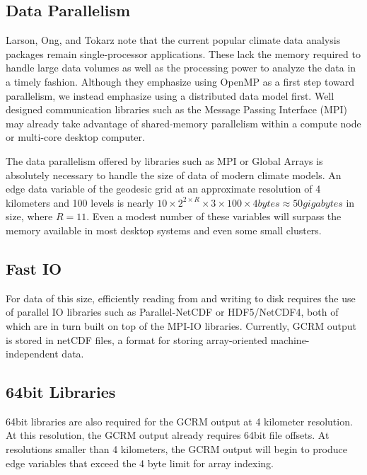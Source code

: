 \subsection{Data Parallelism}

Larson, Ong, and Tokarz note that the current popular climate data analysis
packages remain single-processor applications. These lack the memory required
to handle large data volumes as well as the processing power to analyze the
data in a timely fashion\cite{MODSIM07:LOT}.  Although they emphasize using
OpenMP as a first step toward parallelism, we instead emphasize using a
distributed data model first.  Well designed communication libraries such as
the Message Passing Interface (MPI)\cite{MPI} may already take advantage of
shared-memory parallelism within a compute node or multi-core desktop
computer.

The data parallelism offered by libraries such as MPI or Global Arrays is
absolutely necessary to handle the size of data of modern climate models.  An
edge data variable of the geodesic grid at an approximate resolution of 4
kilometers and 100 levels is nearly $10 \times 2^{2 \times R} \times 3 \times
100 \times 4 \unit{bytes} \approx 50 \unit{gigabytes}$ in size, where $R=11$.
Even a modest number of these variables will surpass the memory available in
most desktop systems and even some small clusters.

\subsection{Fast IO}

For data of this size, efficiently reading from and writing to disk requires
the use of parallel IO libraries such as Parallel-NetCDF\cite{PNETCDF} or
HDF5/NetCDF4\cite{HDF5}\cite{NETCDF}, both of which are in turn built on top
of the MPI-IO libraries\cite{MPIIO}.  Currently, GCRM output is stored in
netCDF\cite{NETCDF} files, a format for storing array-oriented
machine-independent data.

\subsection{64bit Libraries}

64bit libraries are also required for the GCRM output at 4 kilometer
resolution.  At this resolution, the GCRM output already requires 64bit file
offsets.  At resolutions smaller than 4 kilometers, the GCRM output will begin
to produce edge variables that exceed the 4 byte limit for array indexing.


